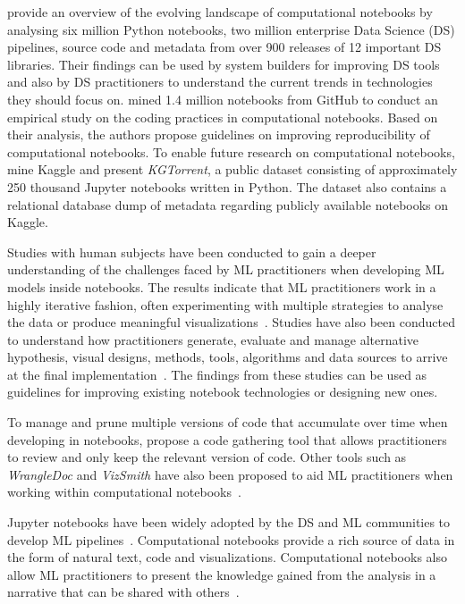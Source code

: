 \documentclass[smallextended]{svjour3}       %
\begin{document}
\citet{psallidas2019data} provide an overview of the evolving landscape of computational notebooks by analysing six million Python notebooks, two million enterprise Data Science (DS) pipelines, source code and metadata from over 900 releases of 12 important DS libraries. Their findings can be used by system builders for improving DS tools and also by DS practitioners to understand the current trends in technologies they should focus on. \citet{pimentel2019large-scale} mined 1.4 million notebooks from GitHub to conduct an empirical study on the coding practices in computational notebooks. Based on their analysis, the authors propose guidelines on improving reproducibility of computational notebooks. To enable future research on computational notebooks, \citet{quaranta2021kgtorrent} mine Kaggle and present \textit{KGTorrent}, a public dataset consisting of approximately 250 thousand Jupyter notebooks written in Python. The dataset also contains a relational database dump of metadata regarding publicly available notebooks on Kaggle.

Studies with human subjects have been conducted to gain a deeper understanding of the challenges faced by ML practitioners when developing ML models inside notebooks. The results indicate that ML practitioners work in a highly iterative fashion, often experimenting with multiple strategies to analyse the data or produce meaningful visualizations~\citep{kandel2012enterprise,kery2018story,liu2019understanding,chattopadhyay2020whats}. Studies have also been conducted to understand how practitioners generate, evaluate and manage alternative hypothesis, visual designs, methods, tools, algorithms and data sources to arrive at the final implementation~\citep{liu2019understanding,kandel2012enterprise}. The findings from these studies can be used as guidelines for improving existing notebook technologies or designing new ones.

To manage and prune multiple versions of code that accumulate over time when developing in notebooks, \citet{head2019managing} propose a code gathering tool that allows practitioners to review and only keep the relevant version of code. Other tools such as \textit{WrangleDoc} and \textit{VizSmith} have also been proposed to aid ML practitioners when working within computational notebooks~\citep{yang2021subtle,bavishi2021vizsmith}.

Jupyter notebooks have been widely adopted by the DS and ML communities to develop ML pipelines~\citep{wang2020assessing,pimentel2019large-scale,quaranta2021kgtorrent}. Computational notebooks provide a rich source of data in the form of natural text, code and visualizations. Computational notebooks also allow ML practitioners to present the knowledge gained from the analysis in a narrative that can be shared with others~\citep{rule2018exploration}.
\end{document}
